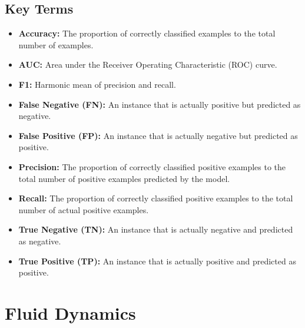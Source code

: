 \subsection{Key Terms}

\begin{itemize}
    \item \textbf{Accuracy:} The proportion of correctly classified examples to the total number of examples.
    \item \textbf{AUC:} Area under the Receiver Operating Characteristic (ROC) curve.
    \item \textbf{F1:} Harmonic mean of precision and recall.
    \item \textbf{False Negative (FN):} An instance that is actually positive but predicted as negative.
    \item \textbf{False Positive (FP):} An instance that is actually negative but predicted as positive.
    \item \textbf{Precision:} The proportion of correctly classified positive examples to the total number of positive examples predicted by the model.
    \item \textbf{Recall:} The proportion of correctly classified positive examples to the total number of actual positive examples.
    \item \textbf{True Negative (TN):} An instance that is actually negative and predicted as negative.
    \item \textbf{True Positive (TP):} An instance that is actually positive and predicted as positive.
\end{itemize}

\section{Fluid Dynamics}


